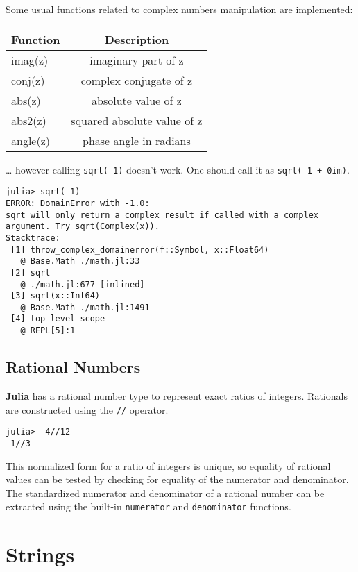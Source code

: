 \documentclass[
]{article}
\begin{document}
Some usual functions related to complex numbers manipulation are
implemented:

\begin{longtable}[]{@{}lc@{}}
\toprule\noalign{}
Function & Description \\
\midrule\noalign{}
\endhead
\bottomrule\noalign{}
\endlastfoot
imag(z) & imaginary part of z \\
conj(z) & complex conjugate of z \\
abs(z) & absolute value of z \\
abs2(z) & squared absolute value of z \\
angle(z) & phase angle in radians \\
\end{longtable}

\ldots{} however calling \texttt{sqrt(-1)} doesn't work. One should call
it as \texttt{sqrt(-1\ +\ 0im)}.

\begin{verbatim}
julia> sqrt(-1)
ERROR: DomainError with -1.0:
sqrt will only return a complex result if called with a complex argument. Try sqrt(Complex(x)).
Stacktrace:
 [1] throw_complex_domainerror(f::Symbol, x::Float64)
   @ Base.Math ./math.jl:33
 [2] sqrt
   @ ./math.jl:677 [inlined]
 [3] sqrt(x::Int64)
   @ Base.Math ./math.jl:1491
 [4] top-level scope
   @ REPL[5]:1
\end{verbatim}

\hypertarget{rational-numbers}{%
\subsection{Rational Numbers}\label{rational-numbers}}

\textbf{Julia} has a rational number type to represent exact ratios of
integers. Rationals are constructed using the \texttt{//} operator.

\begin{verbatim}
julia> -4//12
-1//3
\end{verbatim}

This normalized form for a ratio of integers is unique, so equality of
rational values can be tested by checking for equality of the numerator
and denominator. The standardized numerator and denominator of a
rational number can be extracted using the built-in \texttt{numerator}
and \texttt{denominator} functions.

\newpage

\hypertarget{strings}{%
\section{Strings}\label{strings}}
\end{document}

